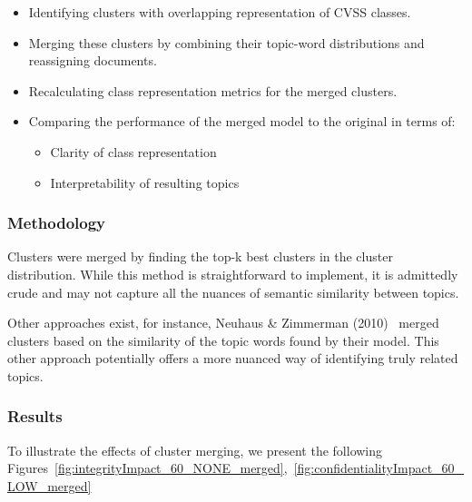 \documentclass[12pt]{article}
\begin{document}
\begin{itemize}

	\item Identifying clusters with overlapping representation of CVSS classes.

	\item Merging these clusters by combining their topic-word distributions and reassigning documents.

	\item Recalculating class representation metrics for the merged clusters.

	\item Comparing the performance of the merged model to the original in terms of:

	      \begin{itemize}

		      \item Clarity of class representation

		      \item Interpretability of resulting topics

	      \end{itemize}

\end{itemize}

\subsubsection{Methodology}

Clusters were merged by finding the top-k best clusters in the cluster distribution. While this
method is straightforward to implement, it is admittedly crude and may not capture all the nuances
of semantic similarity between topics.

Other approaches exist, for instance, Neuhaus \& Zimmerman
(2010)~\cite{cve_topic_modelling} merged clusters based on the similarity of the topic words found
by their model. This other approach potentially offers a more nuanced way of identifying truly related topics.

\subsubsection{Results}

To illustrate the effects of cluster merging, we present the following Figures~\ref{fig:integrityImpact_60_NONE_merged},~\ref{fig:confidentialityImpact_60_LOW_merged}
\end{document}
